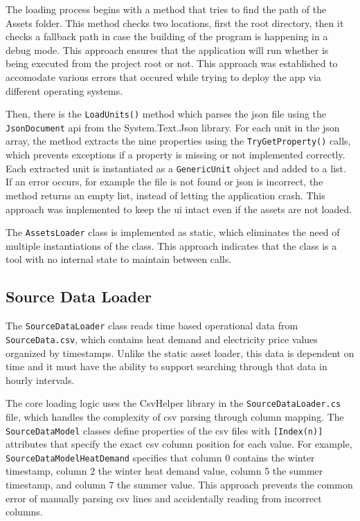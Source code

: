 The loading process begins with a method that tries to find the path of the Assets folder.
This method checks two locations, first the root directory, then it checks a fallback path in case the building
of the program is happening in a debug mode. This approach ensures that the application will run whether is being executed
from the project root or not. This approach was established to accomodate various errors that occured while trying to deploy the app via different operating systems.

Then, there is the \texttt{LoadUnits()} method which parses the \acrshort{json} file using the \texttt{JsonDocument}
\acrshort{api} from the System.Text.Json library. For each unit in the \acrshort{json} array, the method extracts the nine properties
using the \texttt{TryGetProperty()} calls, which prevents exceptions if a property is missing or not implemented correctly.
Each extracted unit is instantiated as a \texttt{GenericUnit} object and added to a list. If an error occurs, for example the
file is not found or \acrshort{json} is incorrect, the method returns an empty list, instead of letting the application crash.
This approach was implemented to keep the \acrshort{ui} intact even if the assets are not loaded.

The \texttt{AssetsLoader} class is implemented as static, which eliminates the need of multiple instantiations of the class.
This approach indicates that the class is a tool with no internal state to maintain between calls.

\subsection{Source Data Loader}

The \texttt{SourceDataLoader} class reads time based operational data from \texttt{SourceData.csv},
which contains heat demand and electricity price values organized by timestamps. Unlike the static asset loader, this data is dependent on time and it must have the ability to support searching through that data in hourly intervals.

The core loading logic uses the CsvHelper library in the \texttt{SourceDataLoader.cs} file,
which handles the complexity of \acrshort{csv} parsing through column mapping. The \texttt{SourceDataModel}
classes define properties of the \acrshort{csv} files with \texttt{[Index(n)]} attributes that specify the exact \acrshort{csv} column position for each value.
For example, \texttt{SourceDataModelHeatDemand} specifies that column 0 contains the winter timestamp, column 2 the winter heat demand value,
column 5 the summer timestamp, and column 7 the summer value. This approach prevents the common error of manually parsing
\acrshort{csv} lines and accidentally reading from incorrect columns.

